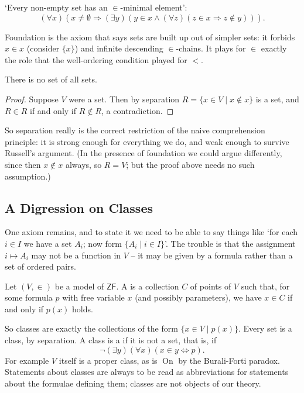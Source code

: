 \documentclass[a4paper]{scrartcl}
\newcommand{\on}{\operatorname{On}}
\newcommand{\ZF}{\mathsf{ZF}}
\begin{document}
\begin{axiom}[Foundation]
  `Every non-empty set has an $\in$-minimal element':
  $$
  (\forall x)(x \neq \emptyset \Rightarrow(\exists y)(y \in x \land(\forall z)(z \in x \Rightarrow z \notin y))).
  $$
\end{axiom}

Foundation is the axiom that says sets are built up out of simpler sets: it forbids $x \in x$ (consider $\{x\}$) and infinite descending $\in$-chains. It plays for $\in$ exactly the role that the well-ordering condition played for $<$.

\begin{proposition}
  There is no set of all sets.
\end{proposition}
\begin{proof}
  Suppose $V$ were a set. Then by separation $R = \{x \in V \mid x \notin x\}$ is a set, and $R \in R$ if and only if $R \notin R$, a contradiction.
\end{proof}

So separation really is the correct restriction of the naive comprehension principle: it is strong enough for everything we do, and weak enough to survive Russell's argument. (In the presence of foundation we could argue differently, since then $x \notin x$ always, so $R = V$; but the proof above needs no such assumption.)

\subsection{A Digression on Classes}

One axiom remains, and to state it we need to be able to say things like `for each $i \in I$ we have a set $A_i$; now form $\{A_i \mid i \in I\}$'. The trouble is that the assignment $i \mapsto A_i$ may not be a function in $V$ -- it may be given by a formula rather than a set of ordered pairs.

\begin{definition}[Class]
  Let $(V, \in)$ be a model of $\ZF$. A  is a collection $C$ of points of $V$ such that, for some formula $p$ with free variable $x$ (and possibly parameters), we have $x \in C$ if and only if $p(x)$ holds.
\end{definition}

So classes are exactly the collections of the form $\{x \in V \mid p(x)\}$. Every set is a class, by separation. A class is a  if it is not a set, that is, if
$$\lnot (\exists y)(\forall x)(x \in y \Leftrightarrow p).$$
For example $V$ itself is a proper class, as is $\on$ by the Burali-Forti paradox. Statements about classes are always to be read as abbreviations for statements about the formulae defining them; classes are not objects of our theory.
\end{document}
